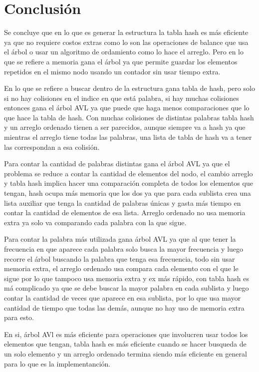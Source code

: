 \documentclass[12pt,letterpaper]{scrartcl}
\begin{document}
\section{Conclusión}


Se concluye que en lo que es generar la estructura la tabla hash es más eficiente ya que no requiere costos extras como lo son las operaciones de balance que usa el árbol o usar un algoritmo de ordamiento como lo hace el arreglo. Pero en lo que se refiere a memoria gana el árbol ya que permite guardar los elementos repetidos en el mismo nodo usando un contador sin usar tiempo extra.

En lo que se refiere a buscar dentro de la estructura gana tabla de hash, pero solo si no hay colisiones en el indice en que está palabra, si hay muchas colisiones entonces gana el árbol AVL ya que puede que haga menos comparaciones que lo que hace la tabla de hash. Con muchas colisiones de distintas palabras tabla hash y un arreglo ordenado tienen a ser parecidos, aunque siempre va a hash ya que mientras el arreglo tiene todas las palabras, una lista de tabla de hash va a tener las correspondan a esa colisión.

Para contar la cantidad de palabras distintas gana el árbol AVL ya que el problema se reduce a contar la cantidad de elementos del nodo, el cambio arreglo y tabla hash implica hacer una comparación completa de todos los elementos que tengan, hash ocupa más memoria que los dos ya que para cada sublista crea una lista auxiliar que tenga la cantidad de palabras únicas y gasta más tiempo en contar la cantidad de elementos de esa lista. Arreglo ordenado no usa memoria extra ya solo va comparando cada palabra con la que sigue.

Para contar la palabra más utilizada gana árbol AVL ya que al que tener la frecuencia en que aparece cada palabra solo busca la mayor frecuencia y luego recorre el árbol buscando la palabra que tenga esa frecuencia, todo sin usar memoria extra, el arreglo ordenado usa compara cada elemento con el que le sigue por lo que tampoco  usa memoria extra y ex más rápido, con tabla hash es má complicado ya que se debe buscar la mayor palabra en cada sublista y luego contar la cantidad de veces que aparece en esa sublista, por lo que usa mayor cantidad de tiempo que todas las demás, aunque no hay uso de memoria extra para esto.

En si, árbol AVl es más eficiente para operaciones que involucren usar todos los elementos que tengan, tabla hash es más eficiente cuando se hacer busqueda de un solo elemento y un arreglo ordenado termina siendo más eficiente en general para lo que es la implementanción.
\end{document}
